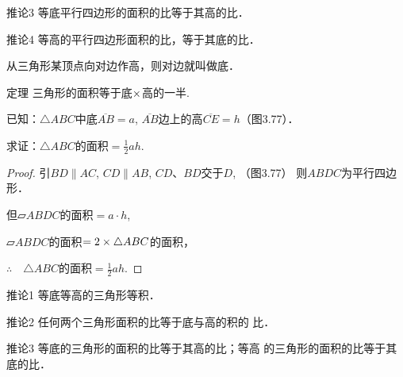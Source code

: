 \begin{blk}
    {推论3}
等底平行四边形的面积的比等于其高的比．
\end{blk}

\begin{blk}
    {推论4} 等高的平行四边形面积的比，等于其底的比．
\end{blk}

从三角形某顶点向对边作高，则对边就叫做底．

\begin{blk}
    {定理} 三角形的面积等于底$\times$高的一半.
\end{blk}

已知：$\triangle ABC$中底$\overline{AB}=a$, $\overline{AB}$边上的高$\overline{CE}=h$（图3.77）．

求证：$\triangle ABC$的面积$=\frac{1}{2}ah$.

\begin{figure}[htp]
    \centering
{}
    \caption{}
\end{figure}

\begin{proof}
    引$BD\parallel AC$, $CD\parallel AB$, $CD$、$BD$交于$D$, （图3.77）
则$ABDC$为平行四边形．

但$\parallelogram ABDC$的面积$=a\cdot h$,

$\parallelogram ABDC$的面积$=2\times\triangle ABC$的面积，

$\therefore\quad \triangle ABC$的面积$=\frac{1}{2}ah$.
\end{proof}

\begin{blk}
   {推论1} 等底等高的三角形等积．
\end{blk}

\begin{blk}
    {推论2}
任何两个三角形面积的比等于底与高的积的
比．
\end{blk}


\begin{blk}
    {推论3} 等底的三角形的面积的比等于其高的比；等高
的三角形的面积的比等于其底的比．
\end{blk}


